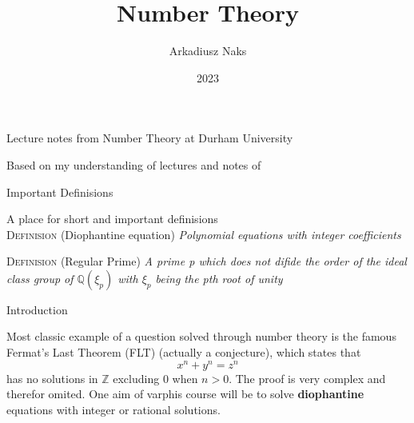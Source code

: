 \documentclass[12pt, letterpaper]{article}
\title{Number Theory}
\author{Arkadiusz Naks}
\date{2023}
\begin{document}
\begin{titlepage}
  \begin{center}
    \makeatletter
    \vspace*{1cm}
    \Huge
    \textbf{\@title}

    \vspace{0.5cm}
    \Large
    Lecture notes from Number Theory at Durham University

    \vspace{1.5cm}

    \textbf{\@author}

    \vfill

    \vspace{0.8cm}

    \small
    Based on my understanding of lectures and notes of \\
    \@date{}
  \end{center}
\end{titlepage}

\tableofcontents
\newpage

\begin{section}{Important Definisions}

  A place for short and important definisions \\

  \textsc{Definision} (Diophantine equation) \textit{Polynomial equations with
    integer coefficients}

  \textsc{Definision} (Regular Prime) \textit{A prime p which does not difide
    the order of the ideal class group of \(\mathbb{Q}(\xi_{p})\) with \(\xi_{p}\)
    being the pth root of unity}

\end{section}

\begin{section}{Introduction}

  Most classic example of a question solved through number theory is the famous
  Fermat's Last Theorem (FLT) (actually a conjecture), which states that
  \[x^{n} + y^{n} = z^{n}\] has no solutions in \(\mathbb{Z}\) excluding 0 when
  \(n > 0\). The proof is very complex and therefor omited. One aim of varphis
  course will be to solve \textbf{diophantine} equations with integer or
  rational solutions.

\end{section}
\end{document}
